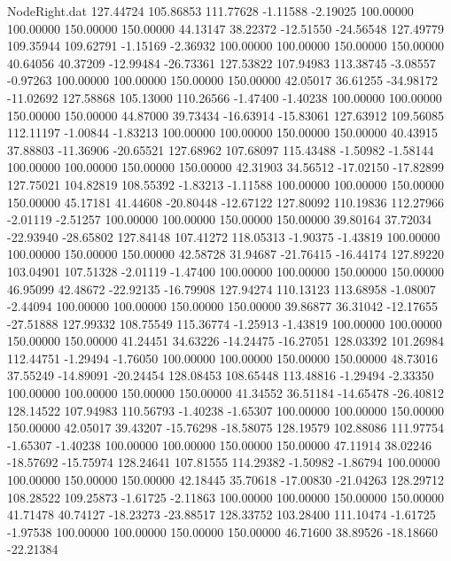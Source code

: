 \begin{filecontents}{NodeRight.dat}
 127.44724  105.86853  111.77628    -1.11588   -2.19025  100.00000  100.00000  150.00000  150.00000   44.13147   38.22372  -12.51550  -24.56548
 127.49779  109.35944  109.62791    -1.15169   -2.36932  100.00000  100.00000  150.00000  150.00000   40.64056   40.37209  -12.99484  -26.73361
 127.53822  107.94983  113.38745    -3.08557   -0.97263  100.00000  100.00000  150.00000  150.00000   42.05017   36.61255  -34.98172  -11.02692
 127.58868  105.13000  110.26566    -1.47400   -1.40238  100.00000  100.00000  150.00000  150.00000   44.87000   39.73434  -16.63914  -15.83061
 127.63912  109.56085  112.11197    -1.00844   -1.83213  100.00000  100.00000  150.00000  150.00000   40.43915   37.88803  -11.36906  -20.65521
 127.68962  107.68097  115.43488    -1.50982   -1.58144  100.00000  100.00000  150.00000  150.00000   42.31903   34.56512  -17.02150  -17.82899
 127.75021  104.82819  108.55392    -1.83213   -1.11588  100.00000  100.00000  150.00000  150.00000   45.17181   41.44608  -20.80448  -12.67122
 127.80092  110.19836  112.27966    -2.01119   -2.51257  100.00000  100.00000  150.00000  150.00000   39.80164   37.72034  -22.93940  -28.65802
 127.84148  107.41272  118.05313    -1.90375   -1.43819  100.00000  100.00000  150.00000  150.00000   42.58728   31.94687  -21.76415  -16.44174
 127.89220  103.04901  107.51328    -2.01119   -1.47400  100.00000  100.00000  150.00000  150.00000   46.95099   42.48672  -22.92135  -16.79908
 127.94274  110.13123  113.68958    -1.08007   -2.44094  100.00000  100.00000  150.00000  150.00000   39.86877   36.31042  -12.17655  -27.51888
 127.99332  108.75549  115.36774    -1.25913   -1.43819  100.00000  100.00000  150.00000  150.00000   41.24451   34.63226  -14.24475  -16.27051
 128.03392  101.26984  112.44751    -1.29494   -1.76050  100.00000  100.00000  150.00000  150.00000   48.73016   37.55249  -14.89091  -20.24454
 128.08453  108.65448  113.48816    -1.29494   -2.33350  100.00000  100.00000  150.00000  150.00000   41.34552   36.51184  -14.65478  -26.40812
 128.14522  107.94983  110.56793    -1.40238   -1.65307  100.00000  100.00000  150.00000  150.00000   42.05017   39.43207  -15.76298  -18.58075
 128.19579  102.88086  111.97754    -1.65307   -1.40238  100.00000  100.00000  150.00000  150.00000   47.11914   38.02246  -18.57692  -15.75974
 128.24641  107.81555  114.29382    -1.50982   -1.86794  100.00000  100.00000  150.00000  150.00000   42.18445   35.70618  -17.00830  -21.04263
 128.29712  108.28522  109.25873    -1.61725   -2.11863  100.00000  100.00000  150.00000  150.00000   41.71478   40.74127  -18.23273  -23.88517
 128.33752  103.28400  111.10474    -1.61725   -1.97538  100.00000  100.00000  150.00000  150.00000   46.71600   38.89526  -18.18660  -22.21384

\end{filecontents}

